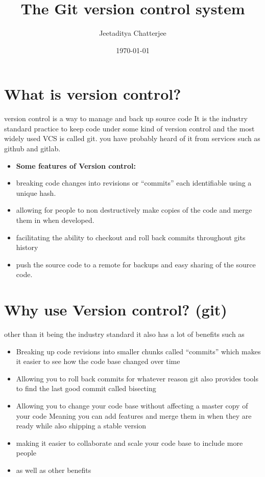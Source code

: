 \documentclass[a4paper]{article}
\author{Jeetaditya Chatterjee}
\date{\today}
\title{The Git version control system}
\begin{document}
\maketitle


\section*{What is version control?}
\label{sec:orged824a8}
\begin{notes}
version control is a way to manage and back up source code
It is the industry standard practice to keep code under some kind of version
control and the most widely used VCS is called git. you have probably heard of it
from services such as github and gitlab.
\end{notes}

\begin{itemize}
\item \textbf{Some features of Version control:}
\item breaking code changes into revisions or ``commits'' each identifiable using a
unique hash.
\item allowing for people to non destructively make copies of the code and merge them
in when developed.
\item facilitating the ability to checkout and roll back commits throughout gits
history
\item push the source code to a remote for backups and easy sharing of the source
code.
\end{itemize}

\section*{Why use Version control? (git)}
\label{sec:org2bf8fb5}
\begin{notes}
other than it being the industry standard it also has a lot of benefits such as
\begin{itemize}
\item Breaking up code revisions into smaller chunks called ``commits''
which makes it easier to see how the code base changed over time
\item Allowing you to roll back commits for whatever reason
git also provides tools to find the last good commit called bisecting
\item Allowing you to change your code base without affecting a master copy of your
code
Meaning you can add features and merge them in when they are ready while also
shipping a stable version
\item making it easier to collaborate and scale your code base to include more people
\item as well as other benefits
\end{itemize}
\end{notes}
\end{document}
